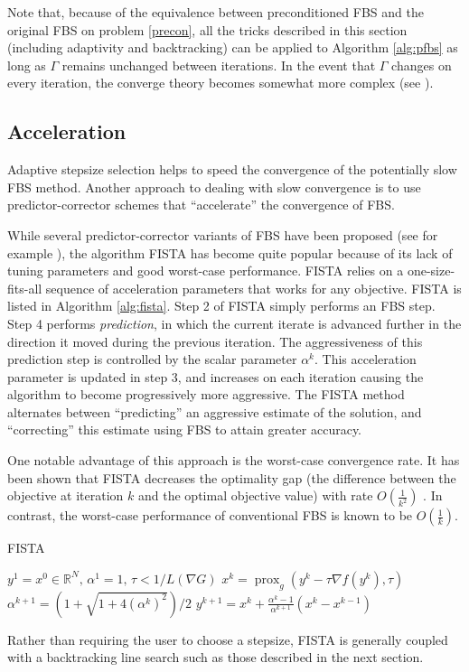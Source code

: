 \documentclass{amsart}
\newcommand{\reals}{\mathbb{R}}
\DeclareMathOperator{\prox}{prox}
\theoremstyle{definition}
\begin{document}
    Note that, because of the equivalence between preconditioned FBS and the original FBS on problem \eqref{precon},  all the tricks described in this section (including adaptivity and backtracking) can be applied to Algorithm \ref{alg:pfbs} as long as $\Gamma$ remains unchanged between iterations.  In the event that $\Gamma$ changes on every iteration, the converge theory becomes somewhat more complex (see \cite{CP11}). 

\subsection{Acceleration} \label{sec:fista}
Adaptive stepsize selection helps to speed the convergence of the potentially slow FBS method.  Another approach to dealing with slow convergence is to use predictor-corrector schemes that ``accelerate'' the convergence of FBS.
 
While several predictor-corrector variants of FBS have been proposed (see for example \cite{BF07_twist}), the algorithm FISTA has become quite popular because of its lack of tuning parameters and good worst-case performance.   FISTA relies on a one-size-fits-all sequence of acceleration parameters that works for any objective.   FISTA is listed in Algorithm \ref{alg:fista}.  Step 2 of FISTA simply performs an FBS step.  Step 4 performs {\em prediction}, in which the current iterate is advanced further in the direction it moved during the previous iteration.  The aggressiveness of this prediction step is controlled by the scalar parameter $\alpha^k.$  This acceleration parameter is updated in step 3, and increases on each iteration causing the algorithm to become progressively more aggressive.  The FISTA method alternates between ``predicting'' an aggressive estimate of the solution, and ``correcting'' this estimate using FBS to attain greater accuracy.

 One notable advantage of this approach is the worst-case convergence rate.  It has been shown that FISTA decreases the optimality gap (the difference between the objective at iteration $k$ and the optimal objective value)  with rate $O(\frac{1}{k^2})$ \cite{BT09}.  In contrast, the worst-case performance of conventional FBS is known to be $O(\frac{1}{k}).$
\begin{algorithm}[H]
\caption{FISTA}
\label{alg:fista}
\begin{algorithmic}[1]
\Require $ y^1=  x^0\in \reals^N, \, \alpha^1=1,\, \tau<1/L(\nabla G)$
\State $x^k =  \prox_g  ( y^k-\tau \nabla f(y^k) , \tau)$
\State $\alpha^{k+1} = (1+\sqrt{1+4(\alpha^k)^2  })/2$
\State $y^{k+1} =x^k+\frac{\alpha^k-1}{\alpha^{k+1} }(x^k-x^{k-1})$\label{predict}
\EndFor 
\end{algorithmic}
\end{algorithm}
\noindent Rather than requiring the user to choose a stepsize, FISTA is generally coupled with a backtracking line search such as those described in the next section.
\end{document}
